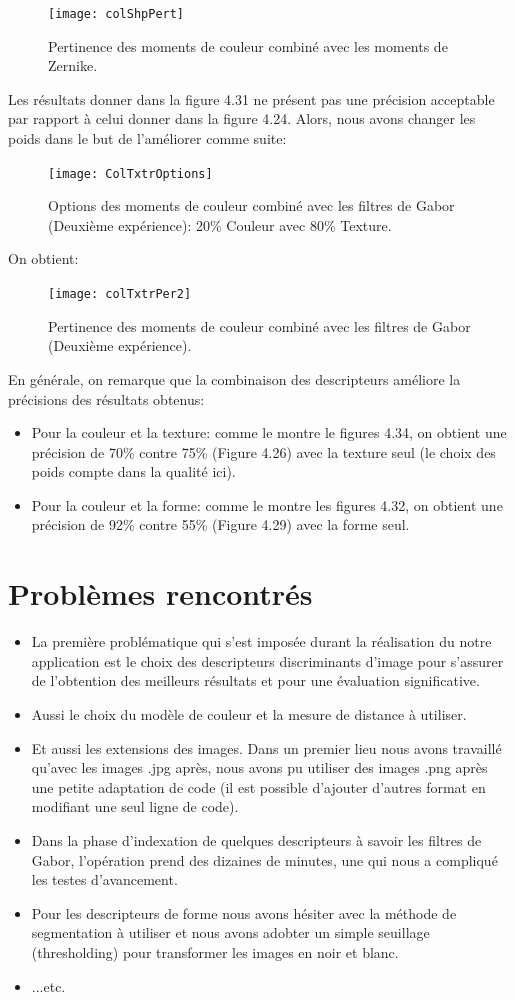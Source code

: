 \begin{figure}[H]
	\centering
	\texttt{[image: colShpPert]} 
	\caption{Pertinence des moments de couleur combiné avec les moments de Zernike.}
\end{figure}
Les résultats donner dans la figure 4.31 ne présent pas une précision acceptable par rapport à celui donner dans la figure 4.24. Alors, nous avons changer les poids dans le but de l'améliorer comme suite:
\begin{figure}[H]
	\centering
	\texttt{[image: ColTxtrOptions]}
	\caption{Options des moments de couleur combiné avec les filtres de Gabor (Deuxième expérience):
		20\% Couleur avec 80\% Texture.}
\end{figure}
On obtient:
\begin{figure}[H]
	\centering
	\texttt{[image: colTxtrPer2]} 
	\caption{Pertinence des moments de couleur combiné avec les filtres de Gabor (Deuxième expérience).}
\end{figure}

En générale, on remarque que la combinaison des descripteurs améliore la précisions des résultats obtenus:
\begin{itemize}
	\item Pour la couleur et la texture: comme le montre le figures 4.34, on obtient une précision de 70\% contre  75\% (Figure 4.26) avec la texture seul (le choix des poids compte dans la qualité ici).
	\item Pour la couleur et la forme: comme le montre les figures 4.32, on obtient une précision de 92\% contre  55\% (Figure 4.29) avec la forme seul.
\end{itemize}
\section{Problèmes rencontrés}
\begin{itemize}
	\item La première problématique qui s’est imposée durant la réalisation du notre
	application est le choix des descripteurs discriminants d’image pour s’assurer de
	l’obtention des meilleurs résultats et pour une évaluation significative.
	\item Aussi le choix du modèle de couleur et la mesure de distance à utiliser.
	
	\item Et aussi les extensions des images. Dans un premier lieu nous avons travaillé
	qu’avec les images .jpg après, nous avons pu utiliser des images .png après une
	petite adaptation de code (il est possible d'ajouter d'autres format en modifiant une seul ligne de code).
	
	\item Dans la phase d'indexation de quelques descripteurs à savoir les filtres de Gabor, l'opération prend des dizaines de minutes, une qui nous a compliqué les testes d'avancement.
	\item Pour les descripteurs de forme nous avons hésiter avec la méthode de segmentation à utiliser et nous avons adobter un simple seuillage (thresholding) pour transformer les images en noir et blanc.
	\item ...etc.
\end{itemize}
